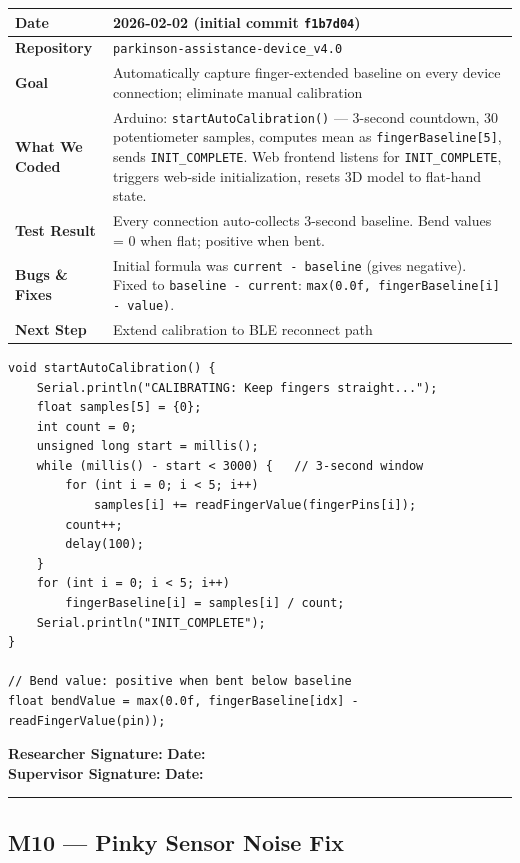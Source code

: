 \documentclass[12pt,a4paper]{article}
\makeatletter
\newcommand{\sigblock}{%
  \vspace{0.6em}
  \noindent\textbf{Researcher Signature:} \underline{\hspace{6cm}} \quad \textbf{Date:} \underline{\hspace{3cm}}\\[0.4em]
  \noindent\textbf{Supervisor Signature:} \underline{\hspace{6cm}} \quad \textbf{Date:} \underline{\hspace{3cm}}
  \vspace{0.4em}\hrule\vspace{0.6em}
}
\newenvironment{milestonetable}{%
  \begin{tcolorbox}[colback=codebg, colframe=codeframe, breakable, left=4pt, right=4pt, top=4pt, bottom=4pt]
  \begin{tabularx}{\linewidth}{@{}>{\bfseries}p{3.2cm} X@{}}
  \toprule
}{%
  \bottomrule
  \end{tabularx}
  \end{tcolorbox}
}
\newcommand{\mrow}[2]{\midrule #1 & #2 \\}
\makeatother
\begin{document}
\begin{milestonetable}
\mrow{Date}{2026-02-02 (initial commit \texttt{f1b7d04})}
\mrow{Repository}{\texttt{parkinson-assistance-device\_v4.0}}
\mrow{Goal}{Automatically capture finger-extended baseline on every device connection; eliminate manual calibration}
\mrow{What We Coded}{Arduino: \texttt{startAutoCalibration()} --- 3-second countdown, 30 potentiometer samples, computes mean as \texttt{fingerBaseline[5]}, sends \texttt{INIT\_COMPLETE}. Web frontend listens for \texttt{INIT\_COMPLETE}, triggers web-side initialization, resets 3D model to flat-hand state.}
\mrow{Test Result}{Every connection auto-collects 3-second baseline. Bend values = 0 when flat; positive when bent.}
\mrow{Bugs \& Fixes}{Initial formula was \texttt{current - baseline} (gives negative). Fixed to \texttt{baseline - current}: \texttt{max(0.0f, fingerBaseline[i] - value)}.}
\mrow{Next Step}{Extend calibration to BLE reconnect path}
\end{milestonetable}

\begin{lstlisting}[style=cppstyle, caption={Auto-calibration function (Arduino firmware)}]
void startAutoCalibration() {
    Serial.println("CALIBRATING: Keep fingers straight...");
    float samples[5] = {0};
    int count = 0;
    unsigned long start = millis();
    while (millis() - start < 3000) {   // 3-second window
        for (int i = 0; i < 5; i++)
            samples[i] += readFingerValue(fingerPins[i]);
        count++;
        delay(100);
    }
    for (int i = 0; i < 5; i++)
        fingerBaseline[i] = samples[i] / count;
    Serial.println("INIT_COMPLETE");
}

// Bend value: positive when bent below baseline
float bendValue = max(0.0f, fingerBaseline[idx] - readFingerValue(pin));
\end{lstlisting}

\sigblock

\subsection{M10 --- Pinky Sensor Noise Fix}
\end{document}
